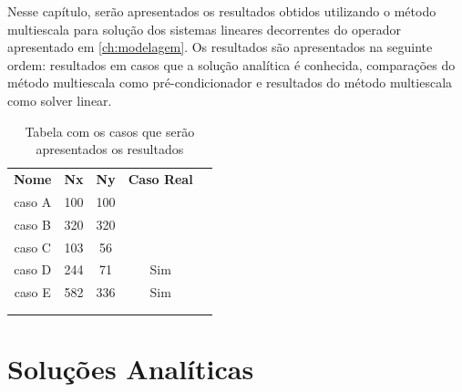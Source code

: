 Nesse capítulo, serão apresentados os resultados obtidos utilizando o método multiescala para solução dos sistemas lineares decorrentes do operador apresentado em \ref{ch:modelagem}. Os resultados são apresentados na seguinte ordem: resultados em casos que a solução analítica é conhecida, comparações do método multiescala como pré-condicionador e resultados do método multiescala como solver linear.



\begin{table}[]
\caption{Tabela com os casos que serão apresentados os resultados}
\centering
\begin{tabular}{ccccl}
\cline{1-4}
\multicolumn{1}{|c|}{\textbf{Nome}} & \multicolumn{1}{c|}{\textbf{Nx}} & \multicolumn{1}{c|}{\textbf{Ny}} & \multicolumn{1}{c|}{\textbf{Caso Real}} &  \\ \cline{1-4}
\multicolumn{1}{|c|}{caso A}        & \multicolumn{1}{c|}{100}         & \multicolumn{1}{c|}{100}         & \multicolumn{1}{c|}{}                   &  \\ \cline{1-4}
\multicolumn{1}{|c|}{caso B}        & \multicolumn{1}{c|}{320}         & \multicolumn{1}{c|}{320}         & \multicolumn{1}{c|}{}                   &  \\ \cline{1-4}
\multicolumn{1}{|c|}{caso C}        & \multicolumn{1}{c|}{103}         & \multicolumn{1}{c|}{56}          & \multicolumn{1}{c|}{}                   &  \\ \cline{1-4}
\multicolumn{1}{|c|}{caso D}        & \multicolumn{1}{c|}{244}            & \multicolumn{1}{c|}{71}            & \multicolumn{1}{c|}{Sim}                &  \\ \cline{1-4}
\multicolumn{1}{|c|}{caso  E}       & \multicolumn{1}{c|}{582}         & \multicolumn{1}{c|}{336}         & \multicolumn{1}{c|}{Sim}                &  \\ \cline{1-4}
\multicolumn{1}{l}{}                & \multicolumn{1}{l}{}             & \multicolumn{1}{l}{}             & \multicolumn{1}{l}{}                    &  \\
\multicolumn{1}{l}{}                & \multicolumn{1}{l}{}             & \multicolumn{1}{l}{}             & \multicolumn{1}{l}{}                    & 
\end{tabular}
\end{table}


\section{Soluções Analíticas}

